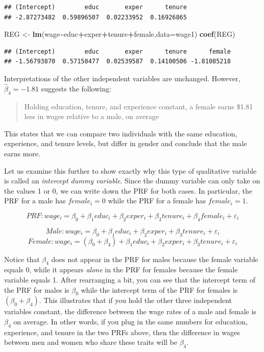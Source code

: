 \documentclass[
]{book}
\newenvironment{Shaded}{\begin{snugshade}}{\end{snugshade}}
\newcommand{\AttributeTok}[1]{\textcolor[rgb]{0.13,0.29,0.53}{#1}}
\newcommand{\FunctionTok}[1]{\textcolor[rgb]{0.13,0.29,0.53}{\textbf{#1}}}
\newcommand{\NormalTok}[1]{#1}
\newcommand{\OtherTok}[1]{\textcolor[rgb]{0.56,0.35,0.01}{#1}}
\newcommand{\SpecialCharTok}[1]{\textcolor[rgb]{0.81,0.36,0.00}{\textbf{#1}}}
\begin{document}
\begin{verbatim}
## (Intercept)        educ       exper      tenure 
## -2.87273482  0.59896507  0.02233952  0.16926865
\end{verbatim}

\begin{Shaded}
\begin{Highlighting}[]
\NormalTok{REG }\OtherTok{\textless{}{-}} \FunctionTok{lm}\NormalTok{(wage}\SpecialCharTok{\textasciitilde{}}\NormalTok{educ}\SpecialCharTok{+}\NormalTok{exper}\SpecialCharTok{+}\NormalTok{tenure}\SpecialCharTok{+}\NormalTok{female,}\AttributeTok{data=}\NormalTok{wage1)}
\FunctionTok{coef}\NormalTok{(REG)}
\end{Highlighting}
\end{Shaded}

\begin{verbatim}
## (Intercept)        educ       exper      tenure      female 
## -1.56793870  0.57150477  0.02539587  0.14100506 -1.81085218
\end{verbatim}

Interpretations of the other independent variables are unchanged. However, \(\hat{\beta}_4 = -1.81\) suggests the following:

\begin{quote}
Holding education, tenure, and experience constant, a female earns \$1.81 less in wages relative to a male, on average
\end{quote}

This states that we can compare two individuals with the same education, experience, and tenure levels, but differ in gender and conclude that the male earns more.

Let us examine this further to show exactly why this type of qualitative variable is called an \emph{intercept dummy variable}. Since the dummy variable can only take on the values 1 or 0, we can write down the PRF for both cases. In particular, the PRF for a male has \(female_i = 0\) while the PRF for a female has \(female_i = 1\).

\[PRF: wage_i=\beta_0+\beta_1educ_i+\beta_2exper_i+\beta_3tenure_i+\beta_4female_i+\varepsilon_i\]

\[Male: wage_i=\beta_0+\beta_1educ_i+\beta_2exper_i+\beta_3tenure_i+\varepsilon_i\]
\[Female: wage_i=(\beta_0+\beta_4)+\beta_1educ_i+\beta_2exper_i+\beta_3tenure_i+\varepsilon_i\]

Notice that \(\beta_4\) does not appear in the PRF for males because the female variable equals 0, while it appears \emph{alone} in the PRF for females because the female variable equals 1. After rearranging a bit, you can see that the intercept term of the PRF for males is \(\beta_0\) while the intercept term of the PRF for females is \((\beta_0+\beta_4)\). This illustrates that if you hold the other three independent variables constant, the difference between the wage rates of a male and female is \(\beta_4\) on average. In other words, if you plug in the same numbers for education, experience, and tenure in the two PRFs above, then the difference in wages between men and women who share these traits will be \(\beta_4\).
\end{document}
